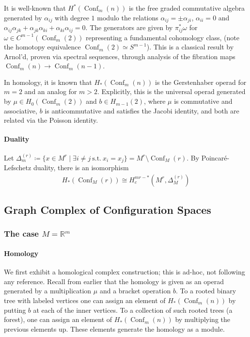 \documentclass{scrartcl}
\theoremstyle{plain}
\theoremstyle{definition}
\newcommand{\R}{\mathbb R}
\newcommand{\iso}{\cong}
\newcommand{\defeq}{\coloneqq}
\DeclareMathOperator{\Conf}{Conf}
\begin{document}
It is well-known that $H^*(\Conf_m(n))$ is the free graded commutative algebra generated by $\alpha_{ij}$ with degree $1$ modulo the relations $\alpha_{ij} = \pm\alpha_{ji}$, $\alpha_{ii}=0$ and $\alpha_{ij}\alpha_{jk} + \alpha_{jk}\alpha_{ki} + \alpha_{ki}\alpha_{ij} = 0$. The generators are given by $\pi_{ij}^*\omega$ for $\omega\in C^{m-1}(\Conf_m(2))$ representing a fundamental cohomology class, (note the homotopy equivalence $\Conf_m(2)\simeq S^{m-1}$). This is a classical result by Arnol'd, proven via spectral sequences, through analysis of the fibration maps $\Conf_m(n) \to \Conf_m(n-1)$. 

In homology, it is known that $H_*(\Conf_m(n))$ is the Gerstenhaber operad for $m=2$ and an analog for $m>2$. Explicitly, this is the universal operad generated by $\mu\in H_0(\Conf_m(2))$ and $b\in H_{m-1}(2)$, where $\mu$ is commutative and associative, $b$ is anticommutative and satisfies the Jacobi identity, and both are related via the Poisson identity. 

\paragraph{Duality}
Let $\Delta_m^{(r)} \defeq \{x\in M^r \mid \exists i\neq j \ \text{s.t.}\ x_i = x_j\} = M^r\setminus \Conf_M(r)$. By Poincaré-Lefschetz duality, there is an isomorphism 
\begin{align*}
    H_*(\Conf_M(r)) \iso H_c^{mr- *}(M^r, \Delta^{(r)}_M)
\end{align*}




\subsection{Graph Complex of Configuration Spaces}

\subsubsection[The euclidean case]{The case $M=\R^m$}

\paragraph{Homology} We first exhibit a homological complex construction; this is ad-hoc, not following any reference. Recall from earlier that the homology is given as an operad generated by a multiplication $\mu$ and a bracket operation $b$. To a rooted binary tree with labeled vertices one can assign an element of $H_*(\Conf_m(n))$ by putting $b$ at each of the inner vertices. To a collection of such rooted trees (a forest), one can assign an element of $H_*(\Conf_m(n))$ by multiplying the previous elements up. These elements generate the homology as a module. 
\end{document}

